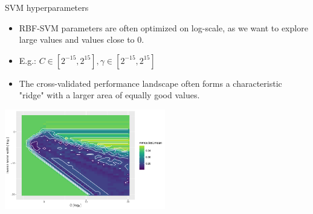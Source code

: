 \documentclass[11pt,compress,t,notes=noshow, xcolor=table]{beamer}
\begin{document}
\begin{vbframe}{SVM hyperparameters}
\begin{itemize}
\item RBF-SVM parameters are often optimized on log-scale, as we want to explore
  large values and values close to 0.
\item E.g.: $C \in [2^{-15}, 2^{15}], \gamma \in [2^{-15}, 2^{15}]$
\item The cross-validated performance landscape often forms
  a characteristic "ridge" with a larger area of equally good values.
\end{itemize}

\begin{center}
  \includegraphics[width=7cm]{figure/svm_rbf_hyperparams_tuning_1.pdf}
\end{center}

\end{vbframe}

\endlecture
\end{document}
